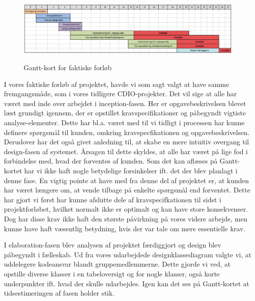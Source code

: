 \documentclass[../main.tex]{subfiles}
\begin{document}
\begin{figure}[H]
    \begin{center}
   {\includegraphics[width=0.7\textheight]{figures/Gantt-2.png}}
    \caption{Gantt-kort for faktiske forløb}
    \end{center}
\end{figure}

\begin{flushleft}
I vores faktiske forløb af projektet, havde vi som sagt valgt at have samme fremgangsmåde, som i vores tidligere CDIO-projekter. Det vil sige at alle har været med inde over arbejdet i inception-fasen. Her er opgavebeskrivelsen blevet læst grundigt igennem, der er opstillet kravspecifikationer og påbegyndt vigtiste analyse-elementer. Dette har bl.a. været med til vi tidligt i processen har kunne definere spørgsmål til kunden, omkring kravspecfikationen og opgavebeskrivelsen. Derudover har det også givet anledning til, at skabe en mere intuitiv overgang til design-fasen af systemet. Årsagen til dette skyldes, at alle har været på lige fod i forbindelse med, hvad der forventes af kunden. Som det kan aflæses på Gantt-kortet har vi ikke haft nogle betydelige forsinkelser ift. det der blev planlagt i denne fase. En vigtig pointe at have med fra denne del af projektet er, at kunden har været længere om, at vende tilbage på enkelte spørgsmål end forventet. Dette har gjort vi først har kunne afslutte dele af kravspecifkationen til sidst i projektforløbet, hvilket normalt ikke er optimalt og kan have store konsekvenser. Dog har disse krav ikke haft den største påvirkning på vores videre arbejde, men kunne have haft væsentlig betydning, hvis der var tale om mere essentielle krav. \newline

I elaboration-fasen blev analysen af projektet færdiggjort og design blev påbegyndt i fælleskab. Ud fra vores udarbejdede designklassediagram valgte vi, at uddelegere kodeansvar blandt gruppemedlemmerne. Dette gjorde vi ved, at opstille diverse klasser i en tabeloversigt og for nogle klasser, også korte underpunkter ift. hvad der skulle udarbejdes. Igen kan det ses på Gantt-kortet at tidsestimeringen af fasen holder stik. \newline


\end{flushleft}
\end{document}
